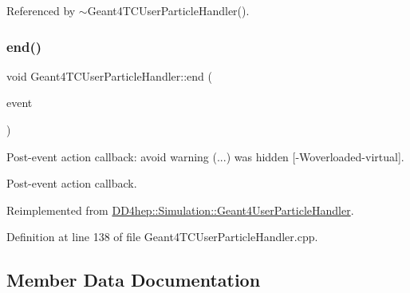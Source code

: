 Referenced by $\sim$\+Geant4\+T\+C\+User\+Particle\+Handler().

\hypertarget{class_d_d4hep_1_1_simulation_1_1_geant4_t_c_user_particle_handler_ac51009a6e712d2b52d2470a5a1a7a03d}{}\label{class_d_d4hep_1_1_simulation_1_1_geant4_t_c_user_particle_handler_ac51009a6e712d2b52d2470a5a1a7a03d} 
\subsubsection{\texorpdfstring{end()}{end()}\hspace{0.1cm}{\footnotesize\ttfamily [2/2]}}
{\footnotesize\ttfamily void Geant4\+T\+C\+User\+Particle\+Handler\+::end (\begin{DoxyParamCaption}\item[{const G4\+Event $\ast$}]{event }\end{DoxyParamCaption})\hspace{0.3cm}{\ttfamily [virtual]}}



Post-\/event action callback\+: avoid warning (...) was hidden \mbox{[}-\/\+Woverloaded-\/virtual\mbox{]}. 

Post-\/event action callback. 

Reimplemented from \hyperlink{class_d_d4hep_1_1_simulation_1_1_geant4_user_particle_handler_a44c00d22c0fba91cf4a32db049728805}{D\+D4hep\+::\+Simulation\+::\+Geant4\+User\+Particle\+Handler}.



Definition at line 138 of file Geant4\+T\+C\+User\+Particle\+Handler.\+cpp.



\subsection{Member Data Documentation}
\hypertarget{class_d_d4hep_1_1_simulation_1_1_geant4_t_c_user_particle_handler_a243303fc54a7945531d49aa1a0eeca7d}{}\label{class_d_d4hep_1_1_simulation_1_1_geant4_t_c_user_particle_handler_a243303fc54a7945531d49aa1a0eeca7d} 
